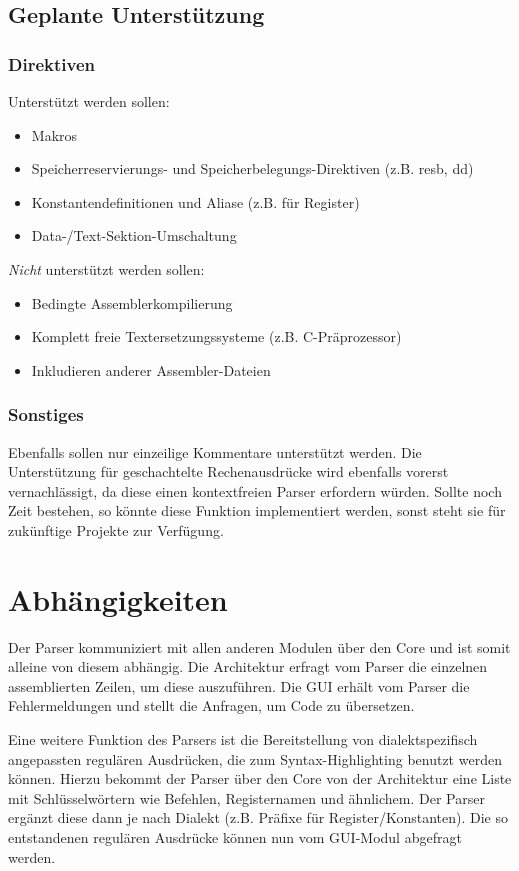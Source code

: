 \subsection{Geplante Unterstützung}
\subsubsection{Direktiven}
Unterstützt werden sollen:

\begin{itemize}
\item Makros
\item Speicherreservierungs- und Speicherbelegungs-Direktiven (z.B. resb, dd)
\item Konstantendefinitionen und Aliase (z.B. für Register)
\item Data-/Text-Sektion-Umschaltung
\end{itemize}

\emph{Nicht} unterstützt werden sollen:

\begin{itemize}
\item Bedingte Assemblerkompilierung
\item Komplett freie Textersetzungssysteme (z.B. C-Präprozessor)
\item Inkludieren anderer Assembler-Dateien
\end{itemize}

\subsubsection{Sonstiges}
Ebenfalls sollen nur einzeilige Kommentare unterstützt werden.
Die Unterstützung für geschachtelte Rechenausdrücke wird ebenfalls vorerst vernachlässigt, da diese einen kontextfreien Parser erfordern würden. Sollte noch Zeit bestehen, so könnte diese Funktion implementiert werden, sonst steht sie für zukünftige Projekte zur Verfügung.

\section{Abhängigkeiten}
Der Parser kommuniziert mit allen anderen Modulen
über den Core und ist somit alleine von diesem abhängig.  Die Architektur
erfragt vom Parser die einzelnen assemblierten Zeilen, um diese auszuführen.
Die GUI erhält vom Parser die Fehlermeldungen und stellt die Anfragen, um Code
zu übersetzen.

Eine weitere Funktion des Parsers ist die Bereitstellung von dialektspezifisch
angepassten regulären Ausdrücken, die zum Syntax-Highlighting benutzt werden
können. Hierzu bekommt der Parser über den Core von der Architektur eine Liste
mit Schlüsselwörtern wie Befehlen, Registernamen und ähnlichem. Der Parser
ergänzt diese dann je nach Dialekt (z.B. Präfixe für Register/Konstanten). Die
so entstandenen regulären Ausdrücke können nun vom GUI-Modul abgefragt werden.

